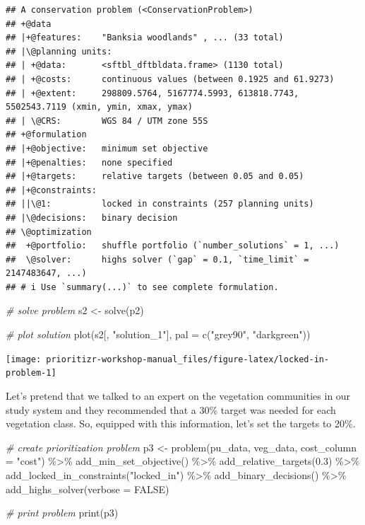 \documentclass[
  12pt,
]{book}
\newenvironment{Shaded}{\begin{snugshade}}{\end{snugshade}}
\newcommand{\AttributeTok}[1]{\textcolor[rgb]{0.77,0.63,0.00}{#1}}
\newcommand{\CommentTok}[1]{\textcolor[rgb]{0.56,0.35,0.01}{\textit{#1}}}
\newcommand{\ConstantTok}[1]{\textcolor[rgb]{0.00,0.00,0.00}{#1}}
\newcommand{\FloatTok}[1]{\textcolor[rgb]{0.00,0.00,0.81}{#1}}
\newcommand{\FunctionTok}[1]{\textcolor[rgb]{0.00,0.00,0.00}{#1}}
\newcommand{\NormalTok}[1]{#1}
\newcommand{\OtherTok}[1]{\textcolor[rgb]{0.56,0.35,0.01}{#1}}
\newcommand{\SpecialCharTok}[1]{\textcolor[rgb]{0.00,0.00,0.00}{#1}}
\newcommand{\StringTok}[1]{\textcolor[rgb]{0.31,0.60,0.02}{#1}}
\begin{document}
\begin{verbatim}
## A conservation problem (<ConservationProblem>)
## +@data
## |+@features:    "Banksia woodlands" , ... (33 total)
## |\@planning units:
## | +@data:       <sftbl_dftbldata.frame> (1130 total)
## | +@costs:      continuous values (between 0.1925 and 61.9273)
## | +@extent:     298809.5764, 5167774.5993, 613818.7743, 5502543.7119 (xmin, ymin, xmax, ymax)
## | \@CRS:        WGS 84 / UTM zone 55S
## +@formulation
## |+@objective:   minimum set objective
## |+@penalties:   none specified
## |+@targets:     relative targets (between 0.05 and 0.05)
## |+@constraints:
## ||\@1:          locked in constraints (257 planning units)
## |\@decisions:   binary decision
## \@optimization
##  +@portfolio:   shuffle portfolio (`number_solutions` = 1, ...)
##  \@solver:      highs solver (`gap` = 0.1, `time_limit` = 2147483647, ...)
## # i Use `summary(...)` to see complete formulation.
\end{verbatim}

\begin{Shaded}
\begin{Highlighting}[]
\CommentTok{\# solve problem}
\NormalTok{s2 }\OtherTok{\textless{}{-}} \FunctionTok{solve}\NormalTok{(p2)}

\CommentTok{\# plot solution}
\FunctionTok{plot}\NormalTok{(s2[, }\StringTok{"solution\_1"}\NormalTok{], }\AttributeTok{pal =} \FunctionTok{c}\NormalTok{(}\StringTok{"grey90"}\NormalTok{, }\StringTok{"darkgreen"}\NormalTok{))}
\end{Highlighting}
\end{Shaded}

\begin{center}\texttt{[image: prioritizr-workshop-manual\_files/figure-latex/locked-in-problem-1]} \end{center}

Let's pretend that we talked to an expert on the vegetation communities in our study system and they recommended that a 30\% target was needed for each vegetation class. So, equipped with this information, let's set the targets to 20\%.

\begin{Shaded}
\begin{Highlighting}[]
\CommentTok{\# create prioritization problem}
\NormalTok{p3 }\OtherTok{\textless{}{-}}
  \FunctionTok{problem}\NormalTok{(pu\_data, veg\_data, }\AttributeTok{cost\_column =} \StringTok{"cost"}\NormalTok{) }\SpecialCharTok{\%\textgreater{}\%}
  \FunctionTok{add\_min\_set\_objective}\NormalTok{() }\SpecialCharTok{\%\textgreater{}\%}
  \FunctionTok{add\_relative\_targets}\NormalTok{(}\FloatTok{0.3}\NormalTok{) }\SpecialCharTok{\%\textgreater{}\%}
  \FunctionTok{add\_locked\_in\_constraints}\NormalTok{(}\StringTok{"locked\_in"}\NormalTok{) }\SpecialCharTok{\%\textgreater{}\%}
  \FunctionTok{add\_binary\_decisions}\NormalTok{() }\SpecialCharTok{\%\textgreater{}\%}
  \FunctionTok{add\_highs\_solver}\NormalTok{(}\AttributeTok{verbose =} \ConstantTok{FALSE}\NormalTok{)}

\CommentTok{\# print problem}
\FunctionTok{print}\NormalTok{(p3)}
\end{Highlighting}
\end{Shaded}
\end{document}
